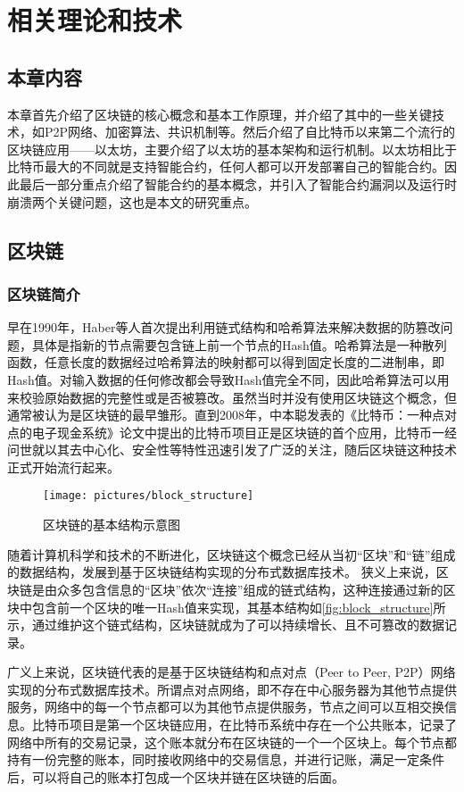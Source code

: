 \chapter{相关理论和技术}
\section{本章内容}
\label{sec:本章内容2}
本章首先介绍了区块链的核心概念和基本工作原理，并介绍了其中的一些关键技术，如P2P网络、加密算法、共识机制等。然后介绍了自比特币以来第二个流行的区块链应用——以太坊，主要介绍了以太坊的基本架构和运行机制。以太坊相比于比特币最大的不同就是支持智能合约，任何人都可以开发部署自己的智能合约。因此最后一部分重点介绍了智能合约的基本概念，并引入了智能合约漏洞以及运行时崩溃两个关键问题，这也是本文的研究重点。
\section{区块链}
\label{sec:区块链}
\subsection{区块链简介}
\label{sec:区块链简介}
早在1990年，Haber等人首次提出利用链式结构和哈希算法来解决数据的防篡改问题\cite{haber1991time}，具体是指新的节点需要包含链上前一个节点的Hash值。哈希算法是一种散列函数，任意长度的数据经过哈希算法的映射都可以得到固定长度的二进制串，即Hash值。对输入数据的任何修改都会导致Hash值完全不同，因此哈希算法可以用来校验原始数据的完整性或是否被篡改。虽然当时并没有使用区块链这个概念，但通常被认为是区块链的最早雏形。直到2008年，中本聪发表的《比特币：一种点对点的电子现金系统》论文\cite{nakamoto2008bitcoin}中提出的比特币项目正是区块链的首个应用，比特币一经问世就以其去中心化、安全性等特性迅速引发了广泛的关注，随后区块链这种技术正式开始流行起来。
\begin{figure}[htbp]
    \centering
    \texttt{[image: pictures/block\_structure]}
    \caption{\label{fig:block_structure}区块链的基本结构示意图}
\end{figure}
随着计算机科学和技术的不断进化，区块链这个概念已经从当初“区块”和“链”组成的数据结构，发展到基于区块链结构实现的分布式数据库技术。
狭义上来说，区块链是由众多包含信息的“区块”依次“连接”组成的链式结构，这种连接通过新的区块中包含前一个区块的唯一Hash值来实现，其基本结构如\autoref{fig:block_structure}所示，通过维护这个链式结构，区块链就成为了可以持续增长、且不可篡改的数据记录。

广义上来说，区块链代表的是基于区块链结构和点对点（Peer to Peer, P2P）网络实现的分布式数据库技术。所谓点对点网络，即不存在中心服务器为其他节点提供服务，网络中的每一个节点都可以为其他节点提供服务，节点之间可以互相交换信息。比特币项目是第一个区块链应用，在比特币系统中存在一个公共账本，记录了网络中所有的交易记录，这个账本就分布在区块链的一个一个区块上。每个节点都持有一份完整的账本，同时接收网络中的交易信息，并进行记账，满足一定条件后，可以将自己的账本打包成一个区块并链在区块链的后面。

